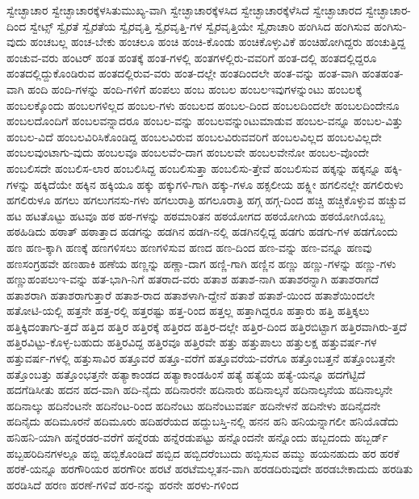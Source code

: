 {ಸ್ವೇಚ್ಛಾಚಾರ
ಸ್ವೇಚ್ಛಾಚಾರಕ್ಕೆಳಸಿತುಮುಖ್ಯ-ವಾಗಿ
ಸ್ವೇಚ್ಛಾಚಾರಕ್ಕೆಳಸಿದ
ಸ್ವೇಚ್ಛಾಚಾರಕ್ಕೆಳೆಸಿದೆ
ಸ್ವೇಚ್ಛಾಚಾರದ
ಸ್ವೇಚ್ಛಾಚಾರ-ದಿಂದ
ಸ್ವೇಟ್ಸ್
ಸ್ವೈರತೆ
ಸ್ವೈರತೆಯ
ಸ್ವೈರವೃತ್ತಿ
ಸ್ವೈರವೃತ್ತಿ-ಗಳ
ಸ್ವೈರವೃತ್ತಿಯೇ
ಸ್ವೈರಾಚಾರಿ
ಹಂಗಿಸಿದ
ಹಂಗಿಸುವ
ಹಂಗಿಸು-ವುದು
ಹಂಚಬಲ್ಲ
ಹಂಚ-ಬೇಕು
ಹಂಚಲೂ
ಹಂಚಿ
ಹಂಚಿ-ಕೊಂಡು
ಹಂಚಿಕೊಳ್ಳುವಿಕೆ
ಹಂಚಿಹೋಗಿದ್ದರು
ಹಂಚುತ್ತಿದ್ದ
ಹಂಚುವ-ವರು
ಹಂಟರ್
ಹಂತ
ಹಂತಕ್ಕೆ
ಹಂತ-ಗಳಲ್ಲಿ
ಹಂತಗಳಲ್ಲಿರು-ವವರಿಗೆ
ಹಂತ-ದಲ್ಲಿ
ಹಂತದಲ್ಲಿದ್ದರೂ
ಹಂತದಲ್ಲಿದ್ದುಕೊಂಡಿರುವ
ಹಂತದಲ್ಲಿರುವ-ವರು
ಹಂತ-ದಲ್ಲೇ
ಹಂತದಿಂದಲೇ
ಹಂತ-ವನ್ನು
ಹಂತ-ವಾಗಿ
ಹಂತಹಂತ-ವಾಗಿ
ಹಂದಿ
ಹಂದಿ-ಗಳನ್ನು
ಹಂದಿ-ಗಳಿಗೆ
ಹಂಪಲು
ಹಂಬ
ಹಂಬಲ
ಹಂಬಲಇವುಗಳನ್ನುಂಟು
ಹಂಬಲಕ್ಕೆ
ಹಂಬಲಕ್ಕೊಂದು
ಹಂಬಲಗಳಿಲ್ಲದ
ಹಂಬಲ-ಗಳು
ಹಂಬಲದ
ಹಂಬಲ-ದಿಂದ
ಹಂಬಲದಿಂದಲೇ
ಹಂಬಲದಿಂದೇನೂ
ಹಂಬಲದೊಂದಿಗೆ
ಹಂಬಲವನ್ನಾದರೂ
ಹಂಬಲ-ವನ್ನು
ಹಂಬಲವನ್ನುಂಟುಮಾಡುವ
ಹಂಬಲ-ವನ್ನೂ
ಹಂಬಲ-ವಿತ್ತು
ಹಂಬಲ-ವಿದೆ
ಹಂಬಲವಿರಿಸಿಕೊಂಡಿದ್ದ
ಹಂಬಲವಿರುವ
ಹಂಬಲವಿರುವವರಿಗೆ
ಹಂಬಲವಿಲ್ಲದ
ಹಂಬಲವಿಲ್ಲದೇ
ಹಂಬಲವುಂಟಾಗು-ವುದು
ಹಂಬಲವೂ
ಹಂಬಲವೆಂ-ದಾಗ
ಹಂಬಲವೇ
ಹಂಬಲವೇನೋ
ಹಂಬಲ-ವೊಂದೇ
ಹಂಬಲಿಸದೇ
ಹಂಬಲಿಸ-ಲಾರ
ಹಂಬಲಿಸಿದ್ದ
ಹಂಬಲಿಸುತ್ತಾ
ಹಂಬಲಿಸು-ತ್ತೇವೆ
ಹಂಬಲಿಸುವ
ಹಕ್ಕನ್ನು
ಹಕ್ಕನ್ನೂ
ಹಕ್ಕಿ-ಗಳನ್ನು
ಹಕ್ಕಿದೆಯೇ
ಹಕ್ಕಿನ
ಹಕ್ಕಿಯೂ
ಹಕ್ಕು
ಹಕ್ಕುಗಳಿ-ಗಾಗಿ
ಹಕ್ಕು-ಗಳೂ
ಹಕ್ಸಲೀಯ
ಹಕ್ಸ್ಲೀ
ಹಗಲಿನಲ್ಲೇ
ಹಗಲಿರುಳು
ಹಗಲಿರುಳೂ
ಹಗಲು
ಹಗಲುಗನಸು-ಗಳು
ಹಗಲುರಾತ್ರಿ
ಹಗಲೂರಾತ್ರಿ
ಹಗ್ಗ
ಹಗ್ಗ-ದಿಂದ
ಹಚ್ಚಿ
ಹಚ್ಚಿಕೊಳ್ಳುವ
ಹಚ್ಚುವ
ಹಟ
ಹಟತೊಟ್ಟು
ಹಟವೂ
ಹಠ
ಹಠ-ಗಳನ್ನು
ಹಠಮಾರಿತನ
ಹಠಯೋಗದ
ಹಠಯೋಗಿಯ
ಹಠಯೋಗಿಯೊಬ್ಬ
ಹಠಹಿಡಿದು
ಹಠಾತ್
ಹಠಾತ್ತಾದ
ಹಡಗನ್ನು
ಹಡಗಿನ
ಹಡಗಿ-ನಲ್ಲಿ
ಹಡಗಿನಲ್ಲಿದ್ದ
ಹಡಗು
ಹಡಗು-ಗಳ
ಹಡಗೊಂದು
ಹಣ
ಹಣ-ಕ್ಕಾಗಿ
ಹಣಕ್ಕೆ
ಹಣಗಳಿಸಲು
ಹಣಗಳಿಸುವ
ಹಣದ
ಹಣ-ದಿಂದ
ಹಣ-ವನ್ನು
ಹಣ-ವನ್ನೂ
ಹಣವು
ಹಣಸಂಗ್ರಹವೇ
ಹಣಹಾಕಿ
ಹಣೆಯ
ಹಣ್ಣನ್ನು
ಹಣ್ಣಾ-ದಾಗ
ಹಣ್ಣಿ-ಗಾಗಿ
ಹಣ್ಣಿನ
ಹಣ್ಣು
ಹಣ್ಣು-ಗಳನ್ನು
ಹಣ್ಣು-ಗಳು
ಹಣ್ಣುಹಂಪಲುಇ-ವನ್ನು
ಹತ-ಭಾಗಿ-ನಿಗೆ
ಹತರಾದ-ವರು
ಹತಾಶ
ಹತಾಶ-ನಾಗಿ
ಹತಾಶರನ್ನಾಗಿ
ಹತಾಶರಾಗದೆ
ಹತಾಶರಾಗಿ
ಹತಾಶರಾಗುತ್ತಾರೆ
ಹತಾಶ-ರಾದ
ಹತಾಶಳಾಗಿ-ದ್ದೇನೆ
ಹತಾಶೆ
ಹತಾಶೆ-ಯಿಂದ
ಹತಾಶೆಯಿಂದಲೇ
ಹತೋಟಿ-ಯಲ್ಲಿ
ಹತ್ತನೇ
ಹತ್ತ-ರಲ್ಲಿ
ಹತ್ತರಷ್ಟು
ಹತ್ತ-ರಿಂದ
ಹತ್ತಲ್ಲ
ಹತ್ತಾಗಿದ್ದರೂ
ಹತ್ತಾರು
ಹತ್ತಿ
ಹತ್ತಿಕ್ಕಲು
ಹತ್ತಿಕ್ಕಿದಂತಾಗು-ತ್ತದೆ
ಹತ್ತಿದ
ಹತ್ತಿರ
ಹತ್ತಿರಕ್ಕೆ
ಹತ್ತಿರದ
ಹತ್ತಿರ-ದಲ್ಲೇ
ಹತ್ತಿರ-ದಿಂದ
ಹತ್ತಿರಬಿಟ್ಟಾಗ
ಹತ್ತಿರವಾಗಿರು-ತ್ತದೆ
ಹತ್ತಿರವಿಟ್ಟು-ಕೊಳ್ಳ-ಬಹುದು
ಹತ್ತಿರವಿದ್ದ
ಹತ್ತಿರವೂ
ಹತ್ತಿರವೇ
ಹತ್ತು
ಹತ್ತುಪಾಲು
ಹತ್ತುಲಕ್ಷ
ಹತ್ತುವರ್ಷ-ಗಳ
ಹತ್ತುವರ್ಷ-ಗಳಲ್ಲಿ
ಹತ್ತುಸಾವಿರ
ಹತ್ತೂವರೆ
ಹತ್ತೂ-ವರೆಗೆ
ಹತ್ತೂವರೆಯ-ವರೆಗೂ
ಹತ್ತೊಂಬತ್ತನೆ
ಹತ್ತೊಂಬತ್ತನೇ
ಹತ್ತೊಂಬತ್ತು
ಹತ್ತೊಂಭತ್ತನೇ
ಹತ್ಯಾಕಾಂಡದ
ಹತ್ಯಾಕಾಂಡಹಿಂಸೆ
ಹತ್ಯೆ
ಹತ್ಯೆಯ
ಹತ್ಯೆ-ಯನ್ನೂ
ಹದಗೆಟ್ಟಿದೆ
ಹದಗೆಡಿಸೀತು
ಹದನ
ಹದ-ವಾಗಿ
ಹದಿ-ನೈದು
ಹದಿನಾರನೇ
ಹದಿನಾರು
ಹದಿನಾಲ್ಕನೆ
ಹದಿನಾಲ್ಕನೆಯ
ಹದಿನಾಲ್ಕನೇ
ಹದಿನಾಲ್ಕು
ಹದಿನೆಂಟನೇ
ಹದಿನೆಂಟ-ರಿಂದ
ಹದಿನೆಂಟು
ಹದಿನೆಂಟುವರ್ಷ
ಹದಿನೇಳನೆ
ಹದಿನೇಳು
ಹದಿನೈದನೇ
ಹದಿನೈದು
ಹದಿಮೂರನೆ
ಹದಿಮೂರು
ಹದಿಹರೆಯದ
ಹದ್ದುಬಸ್ತಿ-ನಲ್ಲಿ
ಹನನ
ಹನಿ
ಹನಿಯನ್ನಾಗಲೀ
ಹನಿಯೊಡೆದು
ಹನಿಹನಿ-ಯಾಗಿ
ಹನ್ನೆರಡರ-ವರೆಗೆ
ಹನ್ನೆರಡು
ಹನ್ನೆರಡುಪಟ್ಟು
ಹನ್ನೊಂದನೇ
ಹನ್ನೊಂದು
ಹಬ್ಬದಂದು
ಹಬ್ಬರ್ಡ್
ಹಬ್ಬಹರಿದಿನಗಳಲ್ಲೂ
ಹಬ್ಬಿ
ಹಬ್ಬಿಕೊಂಡಿದೆ
ಹಬ್ಬಿದ
ಹಬ್ಬಿದರೆಂಬುದು
ಹಬ್ಬಿಸುವ
ಹಮ್ಮು
ಹಯನಹುದು
ಹರ
ಹರಕೆ
ಹರಕೆ-ಯನ್ನೂ
ಹರಗೌರಿಯರ
ಹರಗೌರೀ
ಹರಟೆ
ಹರಟೆಮಲ್ಲತನ-ವಾಗಿ
ಹರಡದಿರುವುದೇ
ಹರಡಬೇಕಾದುದು
ಹರಡಿತು
ಹರಡಿಸಿದೆ
ಹರಣ
ಹರಣೆ-ಗಳಿವೆ
ಹರ-ನನ್ನು
ಹರನೇ
ಹರಳು-ಗಳಿಂದ
}
